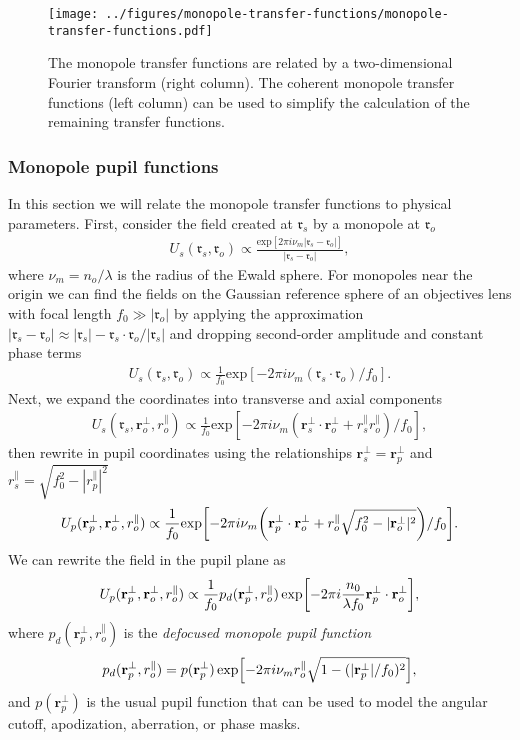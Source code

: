 \documentclass[]{osa-article}
\let\originalleft\left
\let\originalright\right
\renewcommand{\left}{\mathopen{}\mathclose\bgroup\originalleft}
\renewcommand{\right}{\aftergroup\egroup\originalright}
\providecommand{\ro}{\boldsymbol{\mathfrak{r}}_o}
\providecommand{\rs}{\boldsymbol{\mathfrak{r}}_s}
\newcommand{\mypar}{\parallel}
\providecommand{\ropar}{r_o^{\mypar}}
\providecommand{\roperp}{\mathbf{r}_o^{\bot}}
\providecommand{\rspar}{r_s^{\mypar}}
\providecommand{\rsperp}{\mathbf{r}_s^{\bot}}
\providecommand{\rppar}{r_p^{\mypar}}
\providecommand{\rpperp}{\mathbf{r}_p^{\bot}}
\begin{document}
\begin{figure}
  \centering
\texttt{[image: ../figures/monopole-transfer-functions/monopole-transfer-functions.pdf]}
  \caption{
    The monopole transfer functions are related by a two-dimensional Fourier transform (right column). The coherent monopole transfer functions (left column) can be used to simplify the calculation of the remaining transfer functions.
  }
  \label{fig:monopole-transfer-functions}
\end{figure}

\subsubsection{Monopole pupil functions}
In this section we will relate the monopole transfer functions to physical
parameters. First, consider the field created at $\rs$ by a monopole at $\ro$
\begin{align}
  U_s(\rs, \ro) \propto \frac{\text{exp}[2\pi i\nu_m|\rs - \ro|]}{|\rs - \ro|},
\end{align}
where $\nu_m = n_o/\lambda$ is the radius of the Ewald sphere. For monopoles near the origin we can find the fields on the Gaussian reference sphere of an objectives lens with focal length $f_0 \gg |\ro|$ by applying the approximation $|\rs - \ro| \approx |\rs| - \rs\cdot\ro/|\rs|$ and dropping second-order amplitude and constant phase terms
\begin{align}
  U_s(\rs, \ro) \propto \frac{1}{f_0}\text{exp}[-2\pi i\nu_m(\rs\cdot\ro)/f_0].
\end{align}
Next, we expand the coordinates into transverse and axial components
\begin{align}
  U_s(\rs, \roperp, \ropar) \propto \frac{1}{f_0}\text{exp}[-2\pi i\nu_m(\rsperp\cdot\roperp + \rspar\ropar)/f_0],
\end{align}
then rewrite in pupil coordinates using the relationships $\rsperp = \rpperp$ and $\rspar = \sqrt{f_0^2 - |\rppar|^2}$
\begin{align}
  U_p(\rpperp, \roperp, \ropar) \propto \frac{1}{f_0}\text{exp}\left[-2\pi i\nu_m\left(\rpperp\cdot\roperp + \ropar\sqrt{f_0^2 - |\roperp|^2}\right)/f_0\right].
\end{align}
We can rewrite the field in the pupil plane as
\begin{align}
  U_p(\rpperp, \roperp, \ropar) \propto \frac{1}{f_0}p_d(\rpperp, \ropar)\,\text{exp}\left[-2\pi i \frac{n_0}{\lambda f_0}\rpperp\cdot\roperp\right],
\end{align}
where $p_d(\rpperp, \ropar)$ is the \textit{defocused monopole pupil function}  
\begin{align}
  p_d(\rpperp, \ropar) = p(\rpperp)\, \text{exp}\left[-2\pi i\nu_m\ropar\sqrt{1 - (|\rpperp|/f_0)^2}\right],
\end{align}
and $p(\rpperp)$ is the usual pupil function that can be used to model the angular cutoff, apodization, aberration, or phase masks.
\end{document}
